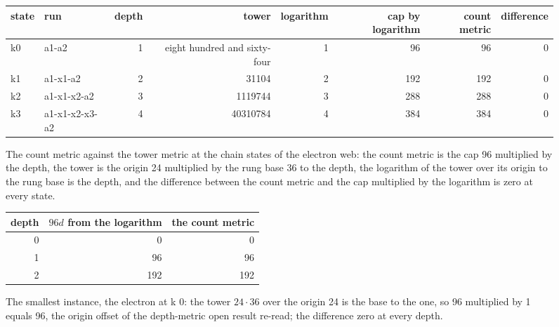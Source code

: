 \begin{figure}[htbp]\centering
\scriptsize
\setlength{\tabcolsep}{3pt}
\begin{adjustbox}{max width=\linewidth}\begin{tabular}{llrrrrrr}
state & run & depth & tower & logarithm & cap by logarithm & count metric & difference \\ \hline
k0 & a1-a2 & 1 & eight hundred and sixty-four & 1 & 96 & 96 & 0 \\
k1 & a1-x1-a2 & 2 & 31104 & 2 & 192 & 192 & 0 \\
k2 & a1-x1-x2-a2 & 3 & 1119744 & 3 & 288 & 288 & 0 \\
k3 & a1-x1-x2-x3-a2 & 4 & 40310784 & 4 & 384 & 384 & 0 \\
\end{tabular}\end{adjustbox}
\caption{The count metric against the tower metric at the chain states of the electron web: the count metric is the cap 96 multiplied by the depth, the tower is the origin 24 multiplied by the rung base 36 to the depth, the logarithm of the tower over its origin to the rung base is the depth, and the difference between the count metric and the cap multiplied by the logarithm is zero at every state.}\label{fig:X-5-D542610-count-against-tower}
\end{figure}
\begin{figure}[h]
\centering
\begin{adjustbox}{max width=\linewidth}\begin{tabular}{rrr}
\hline
depth & $96 d$ from the logarithm & the count metric \\
\hline
0 & 0 & 0 \\
1 & 96 & 96 \\
2 & 192 & 192 \\
\hline
\end{tabular}\end{adjustbox}
\caption{The smallest instance, the electron at k 0: the tower $24\cdot 36$ over the origin 24 is the base to the one, so 96 multiplied by 1 equals 96, the origin offset of the depth-metric open result re-read; the difference zero at every depth.}
\end{figure}
\par\medskip{}\label{narr:close:10-5}\par
